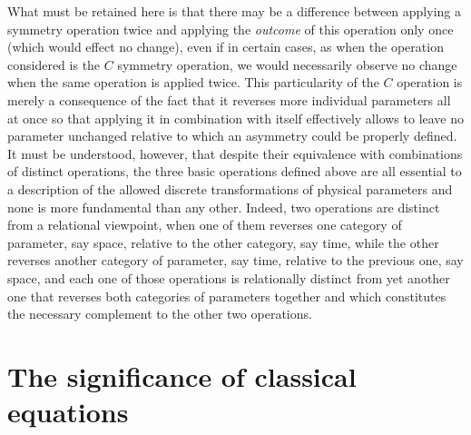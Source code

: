 \documentclass[notitlepage,12pt]{report}
\begin{document}
What must be retained here is that there may be a difference between applying a symmetry operation twice and applying the \textit{outcome} of this operation only once (which would effect no change), even if in certain cases, as when the operation considered is the $C$ symmetry operation, we would necessarily observe no change when the same operation is applied twice. This particularity of the $C$ operation is merely a consequence of the fact that it reverses more individual parameters all at once so that applying it in combination with itself effectively allows to leave no parameter unchanged relative to which an asymmetry could be properly defined. It must be understood, however, that despite their equivalence with combinations of distinct operations, the three basic operations defined above are all essential to a description of the allowed discrete transformations of physical parameters and none is more fundamental than any other. Indeed, two operations are distinct from a relational viewpoint, when one of them reverses one category of parameter, say space, relative to the other category, say time, while the other reverses another category of parameter, say time, relative to the previous one, say space, and each one of those operations is relationally distinct from yet another one that reverses both categories of parameters together and which constitutes the necessary complement to the other two operations.

\section{The significance of classical equations}
\end{document}
